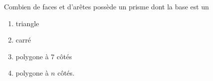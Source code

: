 
\begin{exercice}\label{exo2smath-0299}

    Combien de faces et d'arêtes possède un prisme dont la base est un
    \begin{enumerate}
        \item
            triangle
        \item 
            carré
        \item
            polygone à \( 7\) côtés
        \item
            polygone à \( n\) côtés.
    \end{enumerate}

\end{exercice}
